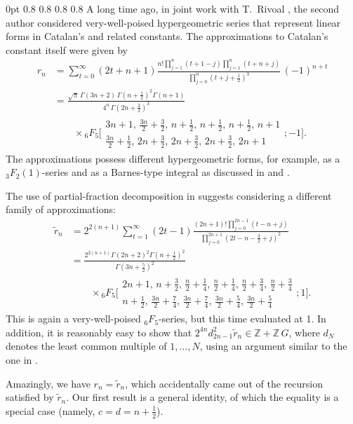 \documentclass[12pt,reqno]{amsart}
\let\wt\widetilde
\begin{document}
  0pt 0.8\textwidth
  0pt 0.8\textwidth
  0pt 0.8\textwidth
  0pt 0.8\textwidth
  0pt \textwidth
A long time ago, in joint work with T.~Rivoal \cite{RZ03},
the second author considered very-well-poised hypergeometric series that represent linear forms in Catalan's and related constants.
The approximations to Catalan's constant itself were given by
\begin{align*}
r_n
&=\sum_{t=0}^\infty(2t+n+1)\frac{n!\prod_{j=1}^n(t+1-j)\prod_{j=1}^n(t+n+j)}{\prod_{j=0}^n(t+j+\frac12)^3}\,(-1)^{n+t}
\\
&=\frac{\sqrt\pi\,\Gamma(3n+2)\,\Gamma(n+\frac12)^2\Gamma(n+1)}{4^n\,\Gamma(2n+\frac32)^3}
\\ &\qquad\times
{}_6F_5\biggl[\begin{matrix} 3n+1, \, \frac{3n}2+\frac32, \, n+\frac12, \, n+\frac12, \, n+\frac12, \, n+1 \\[2pt]
\frac{3n}2+\frac12, \, 2n+\frac32, \, 2n+\frac32, \, 2n+\frac32, \, 2n+1 \end{matrix}; -1\biggr].
\end{align*}
The approximations possess different hypergeometric forms, for example,
as a $_3F_2(1)$-series and as a Barnes-type integral as discussed in \cite{Zu02b} and \cite{Zu03}.

The use of partial-fraction decomposition in \cite{Zu02b} suggests considering a different family of approximations:
\begin{align*}
\wt r_n
&=2^{2(n+1)}\sum_{t=1}^\infty(2t-1)\frac{(2n+1)!\prod_{j=0}^{2n-1}(t-n+j)}{\prod_{j=0}^{2n+1}(2t-n-\frac32+j)^2}
\\
&=\frac{2^{2(n+1)}\Gamma(2n+2)^2\Gamma(n+\frac12)^2}{\Gamma(3n+\frac52)^2}
\\ &\qquad\times
{}_6F_5\biggl[\begin{matrix} 2n+1, \, n+\frac32, \, \frac n2+\frac14, \, \frac n2+\frac14, \, \frac n2+\frac34, \, \frac n2+\frac34 \\[2pt]
n+\frac12, \, \frac{3n}2+\frac74, \, \frac{3n}2+\frac74, \, \frac{3n}2+\frac54, \, \frac{3n}2+\frac54 \end{matrix}; 1\biggr].
\end{align*}
This is again a very-well-poised ${}_6F_5$-series, but this time evaluated at 1. In addition, it is reasonably easy to show that
$2^{4n}d_{2n-1}^2\wt r_n\in\mathbb Z+\mathbb Z\,G$, 
where $d_N$ denotes the least common multiple of $1,\dots,N$,
using an argument similar to the one in \cite{Zu02b}.

Amazingly, we have $r_n=\wt r_n$, which accidentally came out of the recursion satisfied by $\wt r_n$.
Our first result is a general identity, of which the equality is a special case
(namely, $c=d=n+\frac12$).
\end{document}
